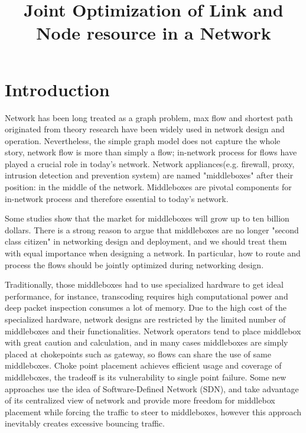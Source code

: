 \documentclass{sig-alternate}
\begin{document}
\title{Joint Optimization of Link and Node resource in a Network}

\maketitle
\begin{abstract}

\end{abstract}

\section{Introduction}

Network has been long treated as a graph problem, max flow and shortest path originated from theory research have been widely used in network design and operation. Nevertheless, the simple graph model does not capture the whole story, network flow is more than simply a flow; in-network process for flows have played a crucial role in today's network. Network appliances(e.g. firewall, proxy, intrusion detection and prevention system) are named "middleboxes" after their position: in the middle of the network. Middleboxes are pivotal components for in-network process and therefore essential to today's network.

Some studies show that the market for middleboxes will grow up to ten billion dollars\cite{SecurityMarketResearch,COMB2012}. There is a strong reason to argue that middleboxes are no longer "second class citizen" in networking design and deployment, and we should treat them with equal importance when designing a network. In particular, how to route and process the flows should be jointly optimized during networking design.

Traditionally, those middleboxes had to use specialized hardware to get ideal performance, for instance, transcoding requires high computational power and deep packet inspection consumes a lot of memory. Due to the high cost of the specialized hardware, network designs are restricted by the limited number of middleboxes and their functionalities. Network operators tend to place middlebox with great caution and calculation, and in many cases middleboxes are simply placed at chokepoints such as gateway, so flows can share the use of same middleboxes. Choke point placement achieves efficient usage and coverage of middleboxes, the tradeoff is its vulnerability to single point failure. Some new approaches use the idea of Software-Defined Network (SDN), and take advantage of its centralized view of network and provide more freedom for middlebox placement while forcing the traffic to steer to middleboxes, however this approach inevitably creates excessive bouncing traffic\cite{SIMPLE2013,FLOWTAGS2014}.
\end{document}
